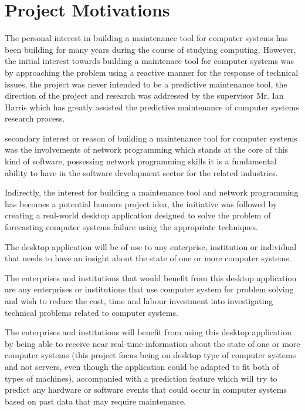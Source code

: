 \section{Project Motivations}

The personal interest in building a maintenance tool for computer systems has been building
for many years during the course of studying computing. However, the initial interest
towards building a maintenace tool for computer systems was by approaching the problem
using a reactive manner for the response of technical issues, the project was never
intended to be a predictive maintenance tool, the direction of the project and research
was addressed by the supervisor Mr. Ian Harris which has greatly assisted the predictive
maintenance of computer systems research process. \par
secondary interest or reason of building a maintenance tool for computer systems was the
involvements of network programming which stands at the core of this
kind of software, possessing network programming skills it is a fundamental ability
to have in the software development sector for the related industries. \par
Indirectly, the interest for building a maintenance tool and network programming
has becomes a potential honours project idea, the initiative was followed by
creating a real-world desktop application designed to solve the problem of forecasting
computer systems failure using the appropriate techniques. \par
The desktop application will be of use to any enterprise, institution or individual that
needs to have an insight about the state of one or more computer systems. \par
The enterprises and institutions that would benefit from this desktop application are any
enterprises or institutions that use computer system for problem solving and wish to reduce the
cost, time and labour investment into investigating technical problems related to computer
systems. \par
The enterprises and institutions will benefit from using this desktop application by
being able to receive near real-time information about the state of one or more computer
systems (this project focus being on desktop type of computer systems and not servers,
even though the application could be adapted to fit both of types of machines),
accompanied with a prediction feature which will try to predict any hardware or software
events that could occur in computer systems based on past data that may require maintenance. \par
